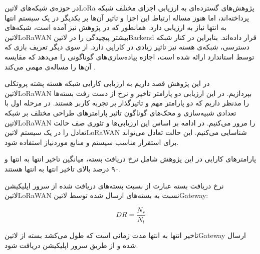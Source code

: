 
در حوزه‌ی شبکه‌های ‌لاتین{LoRa} پژوهش‌های گسترده‌ای به ارزیابی اجزای مختلف شبکه پرداخته‌اند، اما هنوز
مساله ارتباط این اجزا و تاثیر آن‌ها بر یکدیگر در یک سیستم انتها به انتها نیاز به ارزیابی دارد.
همانطور که در پژوهش  نیز آمده است، شبکه‌های ‌لاتین{LoRaWAN} بیشتر پیچیدگی را
در ‌لاتین{Backend} قرار داده‌اند. بنابراین در کنار شبکه دسترسی، شبکه‌ی هسته نیز تاثیر زیادی در کارایی دارد.
از سوی دیگر تعریف بازی که توسط استاندارد ارائه شده است، اجازه پیاده‌سازی‌های گوناگونی را می‌دهد که مقایسه آن‌ها را مساله‌ی مهمی می‌کند
.


در این پژوهش قصد داریم به ارزیابی کارایی شبکه هسته پشته پروتکلی ‌لاتین{LoRaWAN}
بپردازیم. در این ارزیابی دو پارامتر تاخیر و نرخ از دست رفت بسته‌ها را مدنظر داریم که دو پارامتر مهم
و تاثیرگذار بر تجربه کاربر هستند.
در مرحله اول با تعدادی شبیه‌سازی و محک‌های گوناگون تاثیر پارامترهای طراحی مختلف بر شبکه ‌لاتین{LoRaWAN}
را مرور می‌کنیم.
در ادامه بر اساس این ارزیابی‌ها و تئوری صف حالت تعادل را در یک سیستم ‌لاتین{LoRaWAN} شناسایی می‌کنیم.
این حالت تعادل می‌تواند برای استقرار مناسب سیستم و منابع موردنیاز استفاده شود.

پارامترهای کارایی در این پژوهش شامل نرخ دریافت بسته، میانگین تاخیر انتها به انتها و ۹۰ درصد بالای تاخیر انتها به انتها
هستند.

نرخ دریافت بسته عبارت از نسبت بسته‌های دریافت شده از سرور اپلیکیشن ‌لاتین{LoRaWAN}
نسبت به بسته‌های ارسال شده توسط ‌لاتین{Gateway}:

\[
  DR = \frac{N_{r}}{N_{t}}
\]

تاخیر انتها به انتها مدت زمانی است که طول می‌کشد بسته از ‌لاتین{Gateway} ارسال شده
و از طریق سرور اپلیکیشن دریافت شود.
